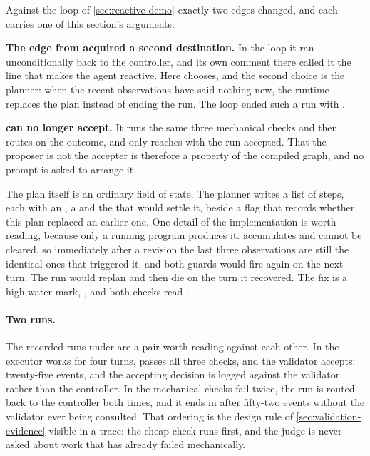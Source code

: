Against the loop of \cref{sec:reactive-demo} exactly two edges changed, and each carries one of
this section's arguments.

\bi

\item \textbf{The edge from  acquired a second destination.} In the loop it ran
unconditionally back to the controller, and its own comment there called it the line that makes the
agent reactive. Here  chooses, and the second choice is the planner: when the
recent observations have said nothing new, the runtime replaces the plan instead of ending the run.
The loop ended such a run with .

\item \textbf{ can no longer accept.} It runs the same three mechanical checks and
then routes on the outcome, and only  reaches  with the run accepted.
That the proposer is not the accepter is therefore a property of the compiled graph, and no prompt
is asked to arrange it.

\ei

The plan itself is an ordinary field of state. The planner writes a list of steps, each with an
, a  and the  that would settle it, beside a
 flag that records whether this plan replaced an earlier one. One detail of the
implementation is worth reading, because only a running program produces it. 
accumulates and cannot be cleared, so immediately after a revision the last three observations are
still the identical ones that triggered it, and both guards would fire again on the next turn. The
run would replan and then die on the turn it recovered. The fix is a high-water mark,
, and both checks read .

\paragraph{Two runs.} The recorded runs under  are a pair worth reading against
each other. In  the executor works for four turns,  passes all
three checks, and the validator accepts: twenty-five events, and the accepting decision is logged
against the validator rather than the controller. In  the mechanical checks
fail twice, the run is routed back to the controller both times, and it ends in 
after fifty-two events without the validator ever being consulted. That ordering is the design rule
of \cref{sec:validation-evidence} visible in a trace: the cheap check runs first, and the judge is
never asked about work that has already failed mechanically.

